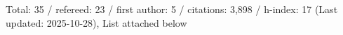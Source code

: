 Total: 35 / refereed: 23 / first author: 5 / citations: 3,898 / h-index: 17 (Last updated: 2025-10-28), List attached below